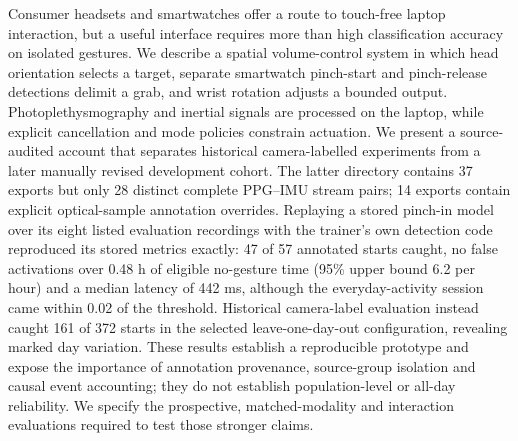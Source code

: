 Consumer headsets and smartwatches offer a route to touch-free laptop interaction, but a useful interface requires more than high classification accuracy on isolated gestures. We describe a spatial volume-control system in which head orientation selects a target, separate smartwatch pinch-start and pinch-release detections delimit a grab, and wrist rotation adjusts a bounded output. Photoplethysmography and inertial signals are processed on the laptop, while explicit cancellation and mode policies constrain actuation. We present a source-audited account that separates historical camera-labelled experiments from a later manually revised development cohort. The latter directory contains 37 exports but only 28 distinct complete PPG--IMU stream pairs; 14 exports contain explicit optical-sample annotation overrides. Replaying a stored pinch-in model over its eight listed evaluation recordings with the trainer's own detection code reproduced its stored metrics exactly: 47 of 57 annotated starts caught, no false activations over 0.48 h of eligible no-gesture time (95\% upper bound 6.2 per hour) and a median latency of 442 ms, although the everyday-activity session came within 0.02 of the threshold. Historical camera-label evaluation instead caught 161 of 372 starts in the selected leave-one-day-out configuration, revealing marked day variation. These results establish a reproducible prototype and expose the importance of annotation provenance, source-group isolation and causal event accounting; they do not establish population-level or all-day reliability. We specify the prospective, matched-modality and interaction evaluations required to test those stronger claims.

